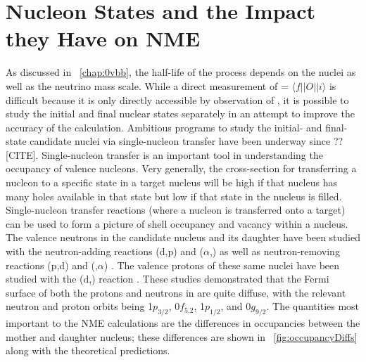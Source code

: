 \section{Nucleon States and the Impact they Have on NME}
\label{sec:valence}

As discussed in {\chap}~\ref{chap:0vbb}, the half-life of the \zvbb process depends on the nuclei as well as the neutrino mass scale.  While a direct measurement of \NME = $\langle f||O||i \rangle$ is difficult because it is only directly accessible by observation of \zvbb, it is possible to study the initial and final nuclear states separately in an attempt to improve the accuracy of the calculation.  Ambitious programs to study the initial- and final-state candidate nuclei via single-nucleon transfer have been underway since ?? [CITE].  Single-nucleon transfer is an important tool in understanding the occupancy of valence nucleons.  Very generally, the cross-section for transferring a nucleon to a specific state in a target nucleus will be high if that nucleus has many holes available in that state but low if that state in the nucleus is filled.  Single-nucleon transfer reactions (where a nucleon is transferred onto a target) can be used to form a picture of shell occupancy and vacancy within a nucleus.  The valence neutrons in the candidate nucleus \GeTargets and its daughter \SeProducts have been studied with the neutron-adding reactions (d,p) and ($\alpha$,) as well as neutron-removing reactions (p,d) and (,$\alpha$) \cite{valenceNeutrons}.  The valence protons of these same nuclei have been studied with the (d,) reaction \cite{valenceProtons}.  These studies demonstrated that the Fermi surface of both the protons and neutrons in \GeTargets are quite diffuse, with the relevant neutron and proton orbits being 1$p_{3/2}$, 0$f_{5.2}$, 1$p_{1/2}$, and 0$g_{9/2}$.  The quantities most important to the NME calculations are the differences in occupancies between the mother and daughter nucleus; these differences are shown in {\fig}~\ref{fig:occupancyDiffs} along with the theoretical predictions.
